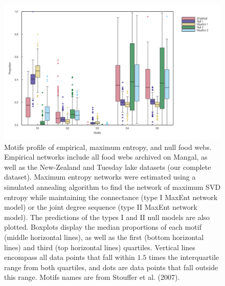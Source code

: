 \documentclass[10pt,oneside]{article}
\makeatletter
\def\maxwidth{\ifdim\Gin@nat@width>\linewidth\linewidth
\else\Gin@nat@width\fi}
\let\Oldincludegraphics\includegraphics
\renewcommand{\includegraphics}[1]{\Oldincludegraphics[width=\maxwidth]{#1}}
\makeatother
\begin{document}
\begin{figure}
\hypertarget{fig:motifs}{%
\centering
\includegraphics{figures/motifs_distribution.png}
\caption{Motifs profile of empirical, maximum entropy, and null food
webs. Empirical networks include all food webs archived on Mangal, as
well as the New-Zealand and Tuesday lake datasets (our complete
dataset). Maximum entropy networks were estimated using a simulated
annealing algorithm to find the network of maximum SVD entropy while
maintaining the connectance (type I MaxEnt network model) or the joint
degree sequence (type II MaxEnt network model). The predictions of the
types I and II null models are also plotted. Boxplots display the median
proportions of each motif (middle horizontal lines), as well as the
first (bottom horizontal lines) and third (top horizontal lines)
quartiles. Vertical lines encompass all data points that fall within
\(1.5\) times the interquartile range from both quartiles, and dots are
data points that fall outside this range. Motifs names are from Stouffer
et al. (2007).}\label{fig:motifs}
}
\end{figure}
\end{document}
